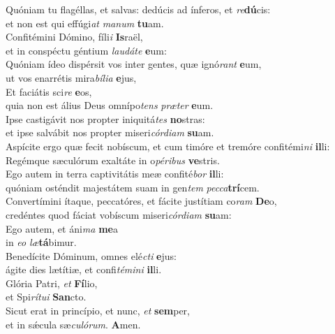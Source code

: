 \evenverse Quóniam tu flagéllas, et salvas: dedúcis ad ínferos, et \textit{re}\textbf{dú}cis:~\*\\
\evenverse et non est qui effúgi\textit{at} \textit{ma}\textit{num} \textbf{tu}am.\\
\oddverse Confitémini Dómino, fíli\textit{i} \textbf{Is}raël,~\*\\
\oddverse et in conspéctu géntium \textit{lau}\textit{dá}\textit{te} \textbf{e}um:\\
\evenverse Quóniam ídeo dispérsit vos inter gentes, quæ ignó\textit{rant} \textbf{e}um,~\*\\
\evenverse ut vos enarrétis mira\textit{bí}\textit{li}\textit{a} \textbf{e}jus,\\
\oddverse Et faciátis sci\textit{re} \textbf{e}os,~\*\\
\oddverse quia non est álius Deus omnípo\textit{tens} \textit{præ}\textit{ter} \textbf{e}um.\\
\evenverse Ipse castigávit nos propter iniquitá\textit{tes} \textbf{no}stras:~\*\\
\evenverse et ipse salvábit nos propter miseri\textit{cór}\textit{di}\textit{am} \textbf{su}am.\\
\oddverse Aspícite ergo quæ fecit nobíscum, et cum timóre et tremóre confitémi\textit{ni} \textbf{il}li:~\*\\
\oddverse Regémque sæculórum exaltáte in o\textit{pé}\textit{ri}\textit{bus} \textbf{ve}stris.\\
\evenverse Ego autem in terra captivitátis meæ confité\textit{bor} \textbf{il}li:~\*\\
\evenverse quóniam osténdit majestátem suam in gen\textit{tem} \textit{pec}\textit{ca}\textbf{trí}cem.\\
\oddverse Convertímini ítaque, peccatóres, et fácite justítiam co\textit{ram} \textbf{De}o,~\*\\
\oddverse credéntes quod fáciat vobíscum miseri\textit{cór}\textit{di}\textit{am} \textbf{su}am:\\
\evenverse Ego autem, et áni\textit{ma} \textbf{me}a~\*\\
\evenverse in \textit{e}\textit{o} \textit{læ}\textbf{tá}bimur.\\
\oddverse Benedícite Dóminum, omnes elé\textit{cti} \textbf{e}jus:~\*\\
\oddverse ágite dies lætítiæ, et confi\textit{té}\textit{mi}\textit{ni} \textbf{il}li.\\
\evenverse Glória Patri, \textit{et} \textbf{Fí}lio,~\*\\
\evenverse et Spi\textit{rí}\textit{tu}\textit{i} \textbf{San}cto.\\
\oddverse Sicut erat in princípio, et nunc, \textit{et} \textbf{sem}per,~\*\\
\oddverse et in sǽcula sæ\textit{cu}\textit{ló}\textit{rum}. \textbf{A}men.\\
